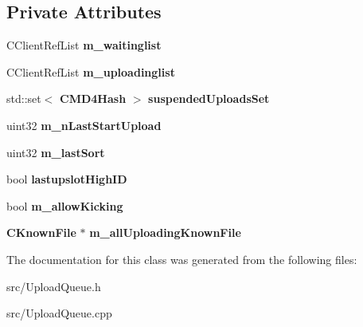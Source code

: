 \subsection*{Private Attributes}
\begin{DoxyCompactItemize}
\item 
CClientRefList {\bfseries m\_\-waitinglist}\label{classCUploadQueue_ab97c57ed61eedf48952029975cc3ce8b}

\item 
CClientRefList {\bfseries m\_\-uploadinglist}\label{classCUploadQueue_a92227a59360567b98e299c194a2f56a4}

\item 
std::set$<$ {\bf CMD4Hash} $>$ {\bfseries suspendedUploadsSet}\label{classCUploadQueue_a1897684966fa7713a01b54c143dc7daa}

\item 
uint32 {\bfseries m\_\-nLastStartUpload}\label{classCUploadQueue_a228080727cee476d8553b4409d294424}

\item 
uint32 {\bfseries m\_\-lastSort}\label{classCUploadQueue_afb0b6fd328d685f5601d05bcecb78ea0}

\item 
bool {\bfseries lastupslotHighID}\label{classCUploadQueue_a5199f7344c3bdea52748ee93396981fc}

\item 
bool {\bfseries m\_\-allowKicking}\label{classCUploadQueue_ad5682d649d6d3b82c0cf5cec7de002d0}

\item 
{\bf CKnownFile} $\ast$ {\bfseries m\_\-allUploadingKnownFile}\label{classCUploadQueue_a1a19b884e0c91d06fb58b8dcd50abd35}

\end{DoxyCompactItemize}


The documentation for this class was generated from the following files:\begin{DoxyCompactItemize}
\item 
src/UploadQueue.h\item 
src/UploadQueue.cpp\end{DoxyCompactItemize}
